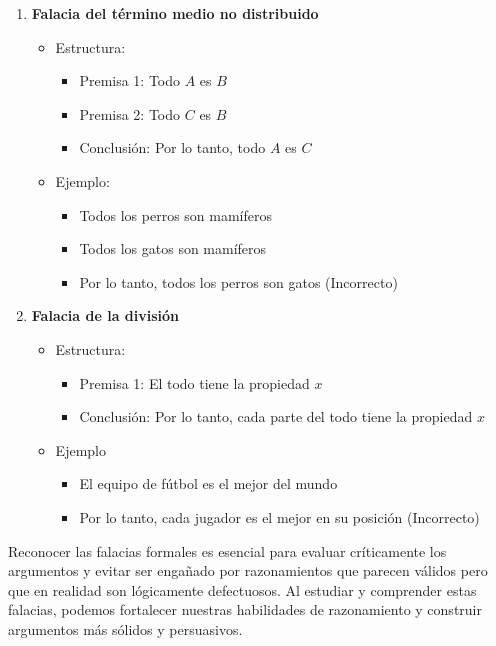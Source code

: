 \begin{enumerate}
	\item \textbf{Falacia del término medio no distribuido} 
	\begin{itemize}
		\item Estructura:
		\begin{itemize}[itemsep=-5pt]
			\item Premisa 1: Todo $A$ es $B$
			\item Premisa 2: Todo $C$ es $B$
			\item Conclusión: Por lo tanto, todo $A$ es $C$
		\end{itemize}
		\item Ejemplo:
		\begin{itemize}[itemsep=-5pt]
			\item Todos los perros son mamíferos
			\item Todos los gatos son mamíferos
			\item Por lo tanto, todos los perros son gatos (Incorrecto)
		\end{itemize}
	\end{itemize}
	
	\item \textbf{Falacia de la división} 
	\begin{itemize}
		\item Estructura:
		\begin{itemize}[itemsep=-5pt]
			\item Premisa 1: El todo tiene la propiedad $x$
			\item Conclusión: Por lo tanto, cada parte del todo tiene la propiedad $x$
		\end{itemize}
		\item Ejemplo
		\begin{itemize}[itemsep=-5pt]
			\item El equipo de fútbol es el mejor del mundo
			\item Por lo tanto, cada jugador es el mejor en su posición (Incorrecto)
		\end{itemize}
	\end{itemize}
\end{enumerate}

Reconocer las falacias formales es esencial para evaluar críticamente los argumentos y evitar ser engañado por razonamientos que parecen válidos pero que en realidad son lógicamente defectuosos. Al estudiar y comprender estas falacias, podemos fortalecer nuestras habilidades de razonamiento y construir argumentos más sólidos y persuasivos.

